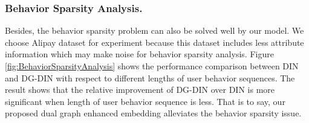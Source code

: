 \subsubsection{Behavior Sparsity Analysis.}
Besides, the behavior sparsity problem can also be solved well by our model. We choose Alipay dataset for experiment because this dataset includes  less attribute information which may make noise for behavior sparsity analysis. Figure \ref{fig:BehaviorSparsityAnalysis} shows the performance comparison between DIN and DG-DIN with respect to different lengths of user behavior sequences. 
The result shows that the relative improvement of DG-DIN over DIN is more significant when length of user behavior sequence is less. That is to say, our proposed dual graph enhanced embedding alleviates the behavior sparsity issue.






